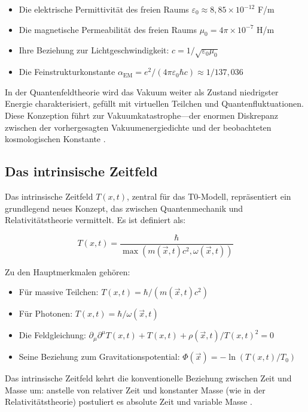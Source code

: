 \documentclass[12pt,a4paper]{article}
\newcommand{\Tfieldt}{T(x,t)}
\newcommand{\alphaEM}{\alpha_{\text{EM}}}
\newcommand{\Tzero}{T_0}
\newcommand{\vecx}{\vec{x}}
\begin{document}
	\begin{itemize}
		\item Die elektrische Permittivität des freien Raums $\varepsilon_0 \approx 8,85 \times 10^{-12}$ F/m
		\item Die magnetische Permeabilität des freien Raums $\mu_0 = 4\pi \times 10^{-7}$ H/m
		\item Ihre Beziehung zur Lichtgeschwindigkeit: $c = 1/\sqrt{\varepsilon_0\mu_0}$
		\item Die Feinstrukturkonstante $\alphaEM = e^2/(4\pi\varepsilon_0\hbar c) \approx 1/137,036$
	\end{itemize}
	
	In der Quantenfeldtheorie wird das Vakuum weiter als Zustand niedrigster Energie charakterisiert, gefüllt mit virtuellen Teilchen und Quantenfluktuationen. Diese Konzeption führt zur Vakuumkatastrophe—der enormen Diskrepanz zwischen der vorhergesagten Vakuumenergiedichte und der beobachteten kosmologischen Konstante \cite{Weinberg1989}.
	
	\subsection{Das intrinsische Zeitfeld}
	\label{subsec:time_field}
	
	Das intrinsische Zeitfeld $\Tfieldt$, zentral für das T0-Modell, repräsentiert ein grundlegend neues Konzept, das zwischen Quantenmechanik und Relativitätstheorie vermittelt. Es ist definiert als:
	
	\begin{equation}
		\Tfieldt = \frac{\hbar}{\max(m(\vecx,t)c^2, \omega(\vecx,t))}
	\end{equation}
	
	Zu den Hauptmerkmalen gehören:
	
	\begin{itemize}
		\item Für massive Teilchen: $\Tfieldt = \hbar/(m(\vecx,t)c^2)$
		\item Für Photonen: $\Tfieldt = \hbar/\omega(\vecx,t)$
		\item Die Feldgleichung: $\partial_{\mu}\partial^{\mu}\Tfieldt + \Tfieldt + \rho(\vecx,t)/\Tfieldt^2 = 0$
		\item Seine Beziehung zum Gravitationspotential: $\Phi(\vecx) = -\ln(\Tfieldt/\Tzero)$
	\end{itemize}
	
	Das intrinsische Zeitfeld kehrt die konventionelle Beziehung zwischen Zeit und Masse um: anstelle von relativer Zeit und konstanter Masse (wie in der Relativitätstheorie) postuliert es absolute Zeit und variable Masse \cite{pascher_part1_2025}.
	
\end{document}
